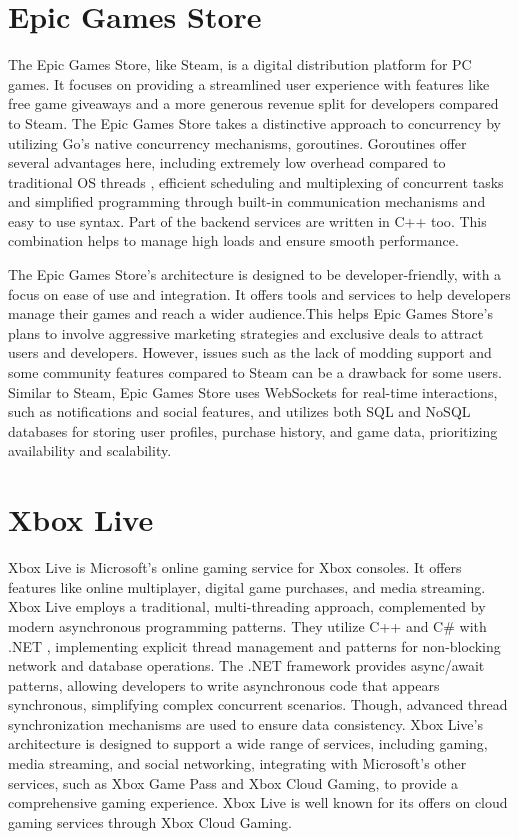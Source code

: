 \documentclass[]{interim}
\begin{document}
\section{Epic Games Store}
The Epic Games Store, like Steam, is a digital distribution platform for
PC games. It focuses on providing a streamlined user experience with features
like free game giveaways and a more generous revenue split for developers
compared to Steam. The Epic Games Store takes a distinctive approach to concurrency by utilizing
Go's native concurrency mechanisms, goroutines\cite{epic_games_jobs}. Goroutines offer several
advantages here, including extremely low overhead compared to traditional OS threads
, efficient scheduling and multiplexing of concurrent tasks and simplified
programming through built-in communication mechanisms and easy to use syntax.
Part of the backend services are written in C++ too\cite{epic_games_jobs}. This combination
helps to manage high loads and ensure smooth performance.

The Epic Games Store's architecture is designed to be developer-friendly, with a
focus on ease of use and integration. It offers tools and services to help
developers manage their games and reach a wider audience.This helps Epic Games
Store's plans to involve aggressive marketing strategies and exclusive
deals to attract users and developers. However, issues such as the lack of modding support and
some community features \cite{epic_games_dev_update} compared to Steam can be a drawback for some users.
Similar to Steam, Epic Games Store uses WebSockets for real-time interactions,
such as notifications and social features, and utilizes both SQL and NoSQL
databases for storing user profiles, purchase history, and game data,
\cite{spring_epic_2016, epic_games_jobs} prioritizing availability and scalability.

\section{Xbox Live}
Xbox Live is Microsoft's online gaming service for Xbox consoles. It offers
features like online multiplayer, digital game purchases, and media streaming.
Xbox Live employs a traditional, multi-threading approach, complemented by modern
asynchronous programming patterns. They utilize C++ and C\# with .NET \cite{kevinasgari_microsoft.xbox.services_nodate}, implementing
explicit thread management and patterns for non-blocking network and database operations.
The .NET framework provides async/await patterns, allowing developers to write
asynchronous code that appears synchronous, simplifying complex concurrent scenarios.
Though, advanced thread synchronization mechanisms are used to ensure data consistency.
\cite{m-stahl_sdk_2023, woolsey_how_2024} Xbox Live's architecture is designed to support a wide range of services, including gaming,
media streaming, and social networking, integrating with Microsoft's other services, such as Xbox Game
Pass and Xbox Cloud Gaming, to provide a comprehensive gaming experience. Xbox Live is well known
for its offers on cloud gaming services through Xbox Cloud Gaming.
\end{document}
